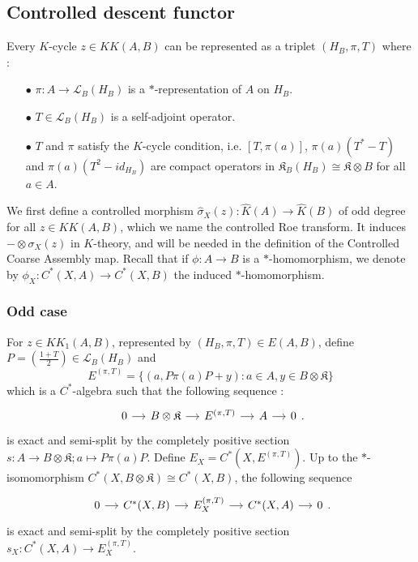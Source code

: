 \subsection{Controlled descent functor}

Every $K$-cycle $z\in KK(A,B)$ can be represented as a triplet $(H_B, \pi, T)$ where :
\begin{itemize}
\item[$\bullet$]$\pi : A\rightarrow \mathcal L_B(H_B)$ is a $*$-representation of $A$ on $H_B$.
\item[$\bullet$]$T\in \mathcal L_B(H_B)$ is a self-adjoint operator.
\item[$\bullet$] $T$ and $\pi$ satisfy the $K$-cycle condition, i.e. $[T,\pi(a)]$, $\pi(a)(T^*-T)$ and $\pi(a)(T^2-id_{H_B})$ are compact operators in $\mathfrak K_B(H_B)\cong \mathfrak K \otimes B$ for all $a\in A$.\\
\end{itemize}

We first define a controlled morphism $\hat \sigma_X(z) : \hat K(A)\rightarrow \hat K(B)$ of odd degree for all $z\in KK(A,B)$, which we name the controlled Roe transform. It induces $-\otimes \sigma_X(z)$ in $K$-theory, and will be needed in the definition of the Controlled Coarse Assembly map. Recall that if $\phi : A \rightarrow B$ is a $*$-homomorphism, we denote by $\phi_X : C^*(X,A)\rightarrow C^*(X,B)$ the induced $*$-homomorphism.

\subsubsection{Odd case} %

For $z\in KK_1(A,B)$, represented by $(H_B,\pi,T)\in E(A,B)$, define $P=(\frac{1+T}{2})\in \mathcal L_B(H_B)$ and 
\[E^{(\pi,T)} = \{(a,P\pi(a)P + y) : a\in A,y\in  B\otimes \mathfrak K\} \]
which is a $C^*$-algebra such that the following sequence :
\[\begin{tikzcd}[column sep = small]0\arrow{r} & B\otimes \mathfrak K \arrow{r} & E^{(\pi,T)}\arrow{r} & A\arrow{r} & 0 \end{tikzcd}.\]
is exact and semi-split by the completely positive section $s : A\rightarrow B\otimes\mathfrak K ; a\mapsto P\pi(a)P$. Define $E_X = C^*(X,E^{(\pi,T)})$. Up to the $*$-isomomorphism $C^*(X,B\otimes\mathfrak K)\cong C^*(X,B)$, the following sequence
\[\begin{tikzcd}[column sep = small]0\arrow{r} & C^*(X,B) \arrow{r} & E_X^{(\pi,T)}\arrow{r} & C^*(X,A)\arrow{r} & 0 \end{tikzcd}.\]
is exact and semi-split by the completely positive section $s_X : C^*(X,A)\rightarrow E_X^{(\pi,T)}$.\\

